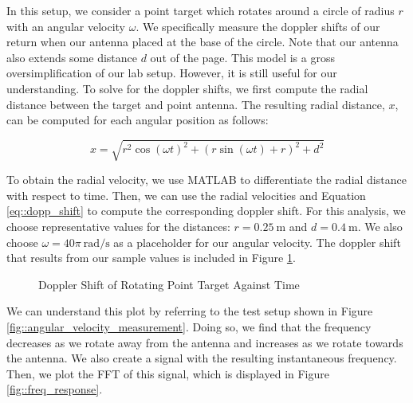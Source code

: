 \documentclass{article}
\begin{document}
\noindent In this setup, we consider a point target which rotates around a circle of radius $r$ with an angular velocity $\omega$. We specifically measure the doppler shifts of our return when our antenna placed at the base of the circle. Note that our antenna also extends some distance $d$ out of the page. This model is a gross oversimplification of our lab setup. However, it is still useful for our understanding. To solve for the doppler shifts, we first compute the radial distance between the target and point antenna. The resulting radial distance, $x$, can be computed for each angular position as follows:

\begin{equation*}
	x = \sqrt{r^2\cos({\omega}t)^2 + (r\sin({\omega}t) + r)^2 + d^2}
\end{equation*}

\noindent To obtain the radial velocity, we use MATLAB to differentiate the radial distance with respect to time. Then, we can use the radial velocities and Equation \ref{eq::dopp_shift} to compute the corresponding doppler shift. For this analysis, we choose representative values for the distances: $r = 0.25\ \text{m}$ and $d = 0.4\ \text{m}$. We also choose $\omega = 40\pi\ \text{rad}/\text{s}$ as a placeholder for our angular velocity. The doppler shift that results from our sample values is included in Figure \ref{fig::dopp_shift_vs_time}.

\begin{figure}[H]
    	\centering
    	\caption{Doppler Shift of Rotating Point Target Against Time}
    	\label{fig::dopp_shift_vs_time}
\end{figure}
 
\noindent We can understand this plot by referring to the test setup shown in Figure \ref{fig::angular_velocity_measurement}. Doing so, we find that the frequency decreases as we rotate away from the antenna and increases as we rotate towards the antenna. We also create a signal with the resulting instantaneous frequency. Then, we plot the FFT of this signal, which is displayed in Figure \ref{fig::freq_response}.
\end{document}
